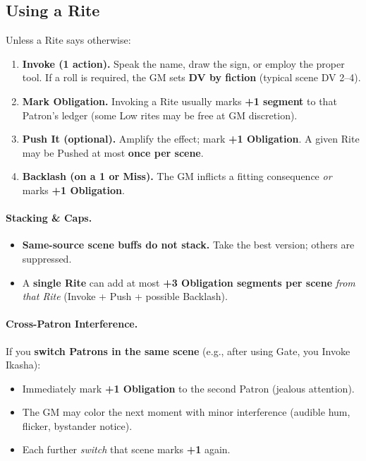 \documentclass[11pt]{article}
\begin{document}
\subsection*{Using a Rite}
Unless a Rite says otherwise:
\begin{enumerate}
  \item \textbf{Invoke (1 action).} Speak the name, draw the sign, or employ the proper tool. If a roll is required, the GM sets \textbf{DV by fiction} (typical scene DV 2–4).
  \item \textbf{Mark Obligation.} Invoking a Rite usually marks \textbf{+1 segment} to that Patron's ledger (some Low rites may be free at GM discretion).
  \item \textbf{Push It (optional).} Amplify the effect; mark \textbf{+1 Obligation}. A given Rite may be Pushed at most \textbf{once per scene}.
  \item \textbf{Backlash (on a 1 or Miss).} The GM inflicts a fitting consequence \emph{or} marks \textbf{+1 Obligation}.
\end{enumerate}

\paragraph{Stacking \& Caps.}
\begin{itemize}
  \item \textbf{Same-source scene buffs do not stack.} Take the best version; others are suppressed.
  \item A \textbf{single Rite} can add at most \textbf{+3 Obligation segments per scene} \emph{from that Rite} (Invoke + Push + possible Backlash).
\end{itemize}

\paragraph{Cross-Patron Interference.}
If you \textbf{switch Patrons in the same scene} (e.g., after using Gate, you Invoke Ikasha):
\begin{itemize}
  \item Immediately mark \textbf{+1 Obligation} to the second Patron (jealous attention).
  \item The GM may color the next moment with minor interference (audible hum, flicker, bystander notice).
  \item Each further \emph{switch} that scene marks \textbf{+1} again.
\end{itemize}
\end{document}
